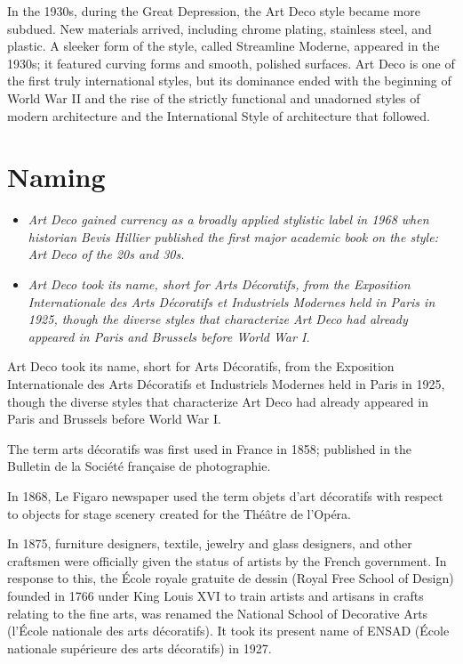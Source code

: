 In the 1930s, during the Great Depression, the Art Deco style became
more subdued. New materials arrived, including chrome plating, stainless
steel, and plastic. A sleeker form of the style, called Streamline
Moderne, appeared in the 1930s; it featured curving forms and smooth,
polished surfaces. Art Deco is one of the first truly international
styles, but its dominance ended with the beginning of World War II and
the rise of the strictly functional and unadorned styles of modern
architecture and the International Style of architecture that followed.

\section{Naming}\label{naming}

\begin{itemize}
\item
  \emph{Art Deco gained currency as a broadly applied stylistic label in
  1968 when historian Bevis Hillier published the first major academic
  book on the style: Art Deco of the 20s and 30s.}
\item
  \emph{Art Deco took its name, short for Arts Décoratifs, from the
  Exposition Internationale des Arts Décoratifs et Industriels Modernes
  held in Paris in 1925, though the diverse styles that characterize Art
  Deco had already appeared in Paris and Brussels before World War I.}
\end{itemize}

Art Deco took its name, short for Arts Décoratifs, from the Exposition
Internationale des Arts Décoratifs et Industriels Modernes held in Paris
in 1925, though the diverse styles that characterize Art Deco had
already appeared in Paris and Brussels before World War I.

The term arts décoratifs was first used in France in 1858; published in
the Bulletin de la Société française de photographie.

In 1868, Le Figaro newspaper used the term objets d'art décoratifs with
respect to objects for stage scenery created for the Théâtre de l'Opéra.

In 1875, furniture designers, textile, jewelry and glass designers, and
other craftsmen were officially given the status of artists by the
French government. In response to this, the École royale gratuite de
dessin (Royal Free School of Design) founded in 1766 under King Louis
XVI to train artists and artisans in crafts relating to the fine arts,
was renamed the National School of Decorative Arts (l'École nationale
des arts décoratifs). It took its present name of ENSAD (École nationale
supérieure des arts décoratifs) in 1927.

